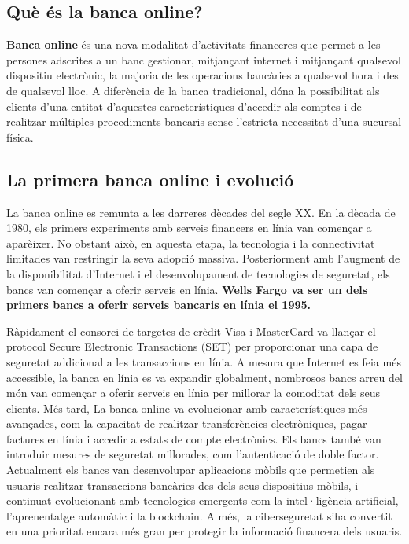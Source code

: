 
\subsection*{Què és la banca online?}


\textbf{Banca online} és una nova modalitat d'activitats financeres que permet a les persones adscrites a un banc gestionar, mitjançant internet i mitjançant qualsevol dispositiu electrònic, la majoria de les operacions bancàries a qualsevol hora i des de qualsevol lloc. A diferència de la banca tradicional, dóna la possibilitat als clients d'una entitat d'aquestes característiques d'accedir als comptes i de realitzar múltiples procediments bancaris sense l'estricta necessitat d'una sucursal física. 


\subsection*{La primera banca online i evolució}

La banca online es remunta a les darreres dècades del segle XX. En la dècada de 1980, els primers experiments amb serveis financers en línia van començar a aparèixer. No obstant això, en aquesta etapa, la tecnologia i la connectivitat limitades van restringir la seva adopció massiva. Posteriorment amb l'augment de la disponibilitat d'Internet i el desenvolupament de tecnologies de seguretat, els bancs van començar a oferir serveis en línia. \textbf{Wells Fargo va ser un dels primers bancs a oferir serveis bancaris en línia el 1995.}

Ràpidament el consorci de targetes de crèdit Visa i MasterCard va llançar el protocol Secure Electronic Transactions (SET) per proporcionar una capa de seguretat addicional a les transaccions en línia. A mesura que Internet es feia més accessible, la banca en línia es va expandir globalment, nombrosos bancs arreu del món van començar a oferir serveis en línia per millorar la comoditat dels seus clients. Més tard, La banca online va evolucionar amb característiques més avançades, com la capacitat de realitzar transferències electròniques, pagar factures en línia i accedir a estats de compte electrònics. Els bancs també van introduir mesures de seguretat millorades, com l'autenticació de doble factor. Actualment els bancs van desenvolupar aplicacions mòbils que permetien als usuaris realitzar transaccions bancàries des dels seus dispositius mòbils, i  continuat evolucionant amb tecnologies emergents com la intel·ligència artificial, l'aprenentatge automàtic i la blockchain. A més, la ciberseguretat s'ha convertit en una prioritat encara més gran per protegir la informació financera dels usuaris.


